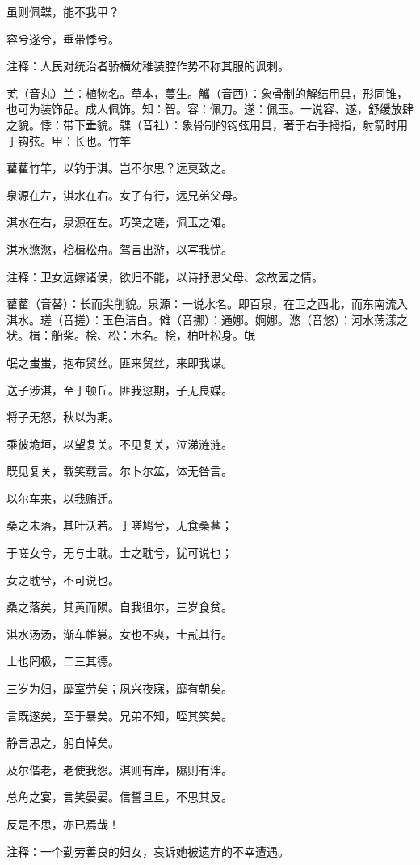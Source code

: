 \documentclass[12pt,UTF8]{ctexbook}
\begin{document}
虽则佩韘，能不我甲？

容兮遂兮，垂带悸兮。

注释：人民对统治者骄横幼稚装腔作势不称其服的讽刺。

芄（音丸）兰：植物名。草本，蔓生。觿（音西）：象骨制的解结用具，形同锥，也可为装饰品。成人佩饰。知：智。容：佩刀。遂：佩玉。一说容、遂，舒缓放肆之貌。悸：带下垂貌。韘（音社）：象骨制的钩弦用具，著于右手拇指，射箭时用于钩弦。甲：长也。竹竿

藋藋竹竿，以钓于淇。岂不尔思？远莫致之。

泉源在左，淇水在右。女子有行，远兄弟父母。

淇水在右，泉源在左。巧笑之瑳，佩玉之傩。

淇水滺滺，桧楫松舟。驾言出游，以写我忧。

注释：卫女远嫁诸侯，欲归不能，以诗抒思父母、念故园之情。

藋藋（音替）：长而尖削貌。泉源：一说水名。即百泉，在卫之西北，而东南流入淇水。瑳（音搓）：玉色洁白。傩（音挪）：通娜。婀娜。滺（音悠）：河水荡漾之状。楫：船桨。桧、松：木名。桧，柏叶松身。氓

氓之蚩蚩，抱布贸丝。匪来贸丝，来即我谋。

送子涉淇，至于顿丘。匪我愆期，子无良媒。

将子无怒，秋以为期。

乘彼垝垣，以望复关。不见复关，泣涕涟涟。

既见复关，载笑载言。尔卜尔筮，体无咎言。

以尔车来，以我贿迁。

桑之未落，其叶沃若。于嗟鸠兮，无食桑葚；

于嗟女兮，无与士耽。士之耽兮，犹可说也；

女之耽兮，不可说也。

桑之落矣，其黄而陨。自我徂尔，三岁食贫。

淇水汤汤，渐车帷裳。女也不爽，士贰其行。

士也罔极，二三其德。

三岁为妇，靡室劳矣；夙兴夜寐，靡有朝矣。

言既遂矣，至于暴矣。兄弟不知，咥其笑矣。

静言思之，躬自悼矣。

及尔偕老，老使我怨。淇则有岸，隰则有泮。

总角之宴，言笑晏晏。信誓旦旦，不思其反。

反是不思，亦已焉哉！

注释：一个勤劳善良的妇女，哀诉她被遗弃的不幸遭遇。
\end{document}
